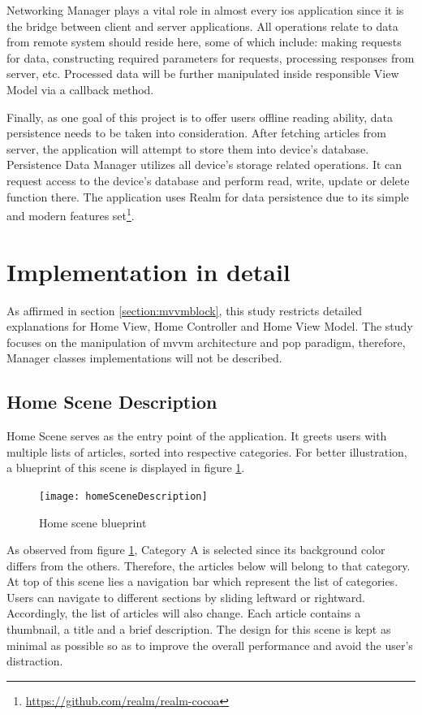 \documentclass[11pt,a4paper,oneside,article]{memoir}
\begin{document}
Networking Manager plays a vital role in almost every \gls{ios} application since it is the bridge between client and server applications. All operations relate to data from remote system should reside here, some of which include: making requests for data, constructing required parameters for requests, processing responses from server, etc. Processed data will be further manipulated inside responsible View Model via a \gls{callback} method.

Finally, as one goal of this project is to offer users offline reading ability, data persistence needs to be taken into consideration. After fetching articles from server, the application will attempt to store them into device's database. Persistence Data Manager utilizes all device's storage related operations. It can request access to the device's database and perform read, write, update or delete function there. The application uses Realm for data persistence due to its simple and modern features set\footnote{\url{https://github.com/realm/realm-cocoa}}.

\section{Implementation in detail}
As affirmed in section \ref{section:mvvmblock}, this study restricts detailed explanations for Home View, Home Controller and Home View Model. The study focuses on the manipulation of \gls{mvvm} architecture and \gls{pop} paradigm, therefore, Manager classes implementations will not be described.

\subsection{Home Scene Description}
Home Scene serves as the entry point of the application. It greets users with multiple lists of articles, sorted into respective categories. For better illustration, a blueprint of this scene is displayed in figure \ref{fig:homeSceneDescription}.

\begin{figure}[H]

\centering
\texttt{[image: homeSceneDescription]}

\caption{Home scene blueprint}
\label{fig:homeSceneDescription}

\end{figure}

As observed from figure \ref{fig:homeSceneDescription}, Category A is selected since its background color differs from the others. Therefore, the articles below will belong to that category. At top of this scene lies a navigation bar which represent the list of categories. Users can navigate to different sections by sliding leftward or rightward.  Accordingly, the list of articles will also change. Each article contains a thumbnail, a title and a brief description. The design for this scene is kept as minimal as possible so as to improve the overall performance and avoid the user's distraction.
\end{document}
